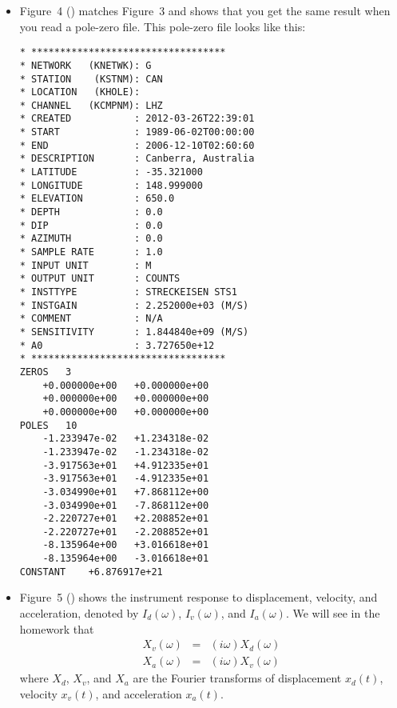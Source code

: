 \documentclass[11pt,titlepage,fleqn]{article}
\begin{document}
\begin{itemize}
\item Figure~4 () matches Figure~3 and shows that you get the same result when you read a pole-zero file. This pole-zero file looks like this:
%
\small
\begin{spacing}{1.0}
\begin{verbatim}
* **********************************
* NETWORK   (KNETWK): G
* STATION    (KSTNM): CAN
* LOCATION   (KHOLE): 
* CHANNEL   (KCMPNM): LHZ
* CREATED           : 2012-03-26T22:39:01
* START             : 1989-06-02T00:00:00
* END               : 2006-12-10T02:60:60
* DESCRIPTION       : Canberra, Australia
* LATITUDE          : -35.321000
* LONGITUDE         : 148.999000 
* ELEVATION         : 650.0  
* DEPTH             : 0.0  
* DIP               : 0.0  
* AZIMUTH           : 0.0  
* SAMPLE RATE       : 1.0
* INPUT UNIT        : M
* OUTPUT UNIT       : COUNTS
* INSTTYPE          : STRECKEISEN STS1
* INSTGAIN          : 2.252000e+03 (M/S)
* COMMENT           : N/A
* SENSITIVITY       : 1.844840e+09 (M/S)
* A0                : 3.727650e+12
* **********************************
ZEROS	3
	+0.000000e+00	+0.000000e+00
	+0.000000e+00	+0.000000e+00
	+0.000000e+00	+0.000000e+00
POLES	10
	-1.233947e-02	+1.234318e-02
	-1.233947e-02	-1.234318e-02
	-3.917563e+01	+4.912335e+01
	-3.917563e+01	-4.912335e+01
	-3.034990e+01	+7.868112e+00
	-3.034990e+01	-7.868112e+00
	-2.220727e+01	+2.208852e+01
	-2.220727e+01	-2.208852e+01
	-8.135964e+00	+3.016618e+01
	-8.135964e+00	-3.016618e+01
CONSTANT	+6.876917e+21
\end{verbatim}
\end{spacing}
\normalsize


\item Figure~5 () shows the instrument response to displacement, velocity, and acceleration, denoted by $I_d(\omega)$, $I_v(\omega)$, and $I_a(\omega)$. We will see in the homework that 
%
\begin{eqnarray*}
X_v(\omega) &=& (i\omega) X_d(\omega)
\\
X_a(\omega) &=& (i\omega) X_v(\omega)
\end{eqnarray*}
%
where $X_d$, $X_v$, and $X_a$ are the Fourier transforms of displacement $x_d(t)$, velocity $x_v(t)$, and acceleration $x_a(t)$.


\end{itemize}
\end{document}

